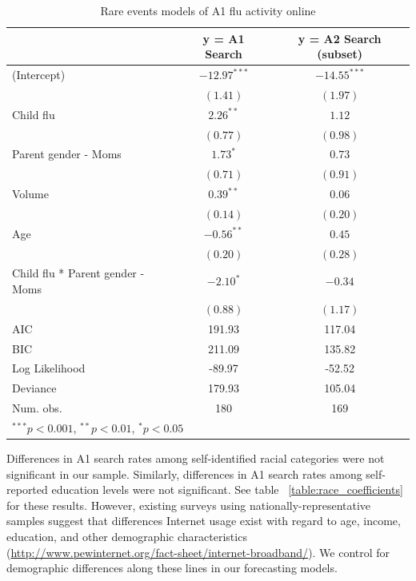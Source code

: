 \documentclass[12pt]{article}
\begin{document}
\begin{table}
\begin{center}
\begin{tabular}{l c c }
\hline
 & y = A1 Search & y = A2 Search (subset) \\
\hline
(Intercept)              & $-12.97^{***}$ & $-14.55^{***}$ \\
                         & $(1.41)$       & $(1.97)$       \\
Child flu                   & $2.26^{**}$    & $1.12$         \\
                         & $(0.77)$       & $(0.98)$       \\
Parent gender - Moms        & $1.73^{*}$     & $0.73$         \\
                         & $(0.71)$       & $(0.91)$       \\
Volume                   & $0.39^{**}$    & $0.06$         \\
                         & $(0.14)$       & $(0.20)$       \\
Age                      & $-0.56^{**}$   & $0.45$         \\
                         & $(0.20)$       & $(0.28)$       \\
Child flu * Parent gender - Moms & $-2.10^{*}$    & $-0.34$        \\
                         & $(0.88)$       & $(1.17)$       \\
\hline
AIC                      & 191.93         & 117.04         \\
BIC                      & 211.09         & 135.82         \\
Log Likelihood           & -89.97         & -52.52         \\
Deviance                 & 179.93         & 105.04         \\
Num. obs.                & 180            & 169            \\
\hline
\multicolumn{3}{l}{\scriptsize{$^{***}p<0.001$, $^{**}p<0.01$, $^*p<0.05$}}
\end{tabular}
\caption{Rare events models of A1 flu activity online}
\label{table:coefficients_parents}
\end{center}
\end{table}

Differences in A1 search rates among self-identified racial categories were not significant in our sample. Similarly, differences in A1 search rates among self-reported education levels were not significant. See table ~\ref{table:race_coefficients} for these results. However, existing surveys using nationally-representative samples suggest that differences Internet usage exist with regard to age, income, education, and other demographic characteristics (\url{http://www.pewinternet.org/fact-sheet/internet-broadband/}). We control for demographic differences along these lines in our forecasting models. 
\end{document}
